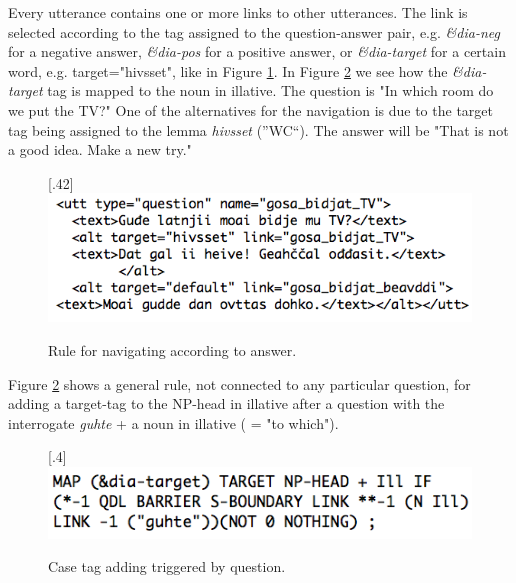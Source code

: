 \documentclass[11pt]{article}
\begin{document}
Every utterance contains one or more links to other utterances. The link is selected according to the tag assigned to the question-answer pair, e.g. \textit{\&dia-neg} for a negative answer, \textit{\&dia-pos} for a positive answer, or \textit{\&dia-target} for a certain word, e.g. target="hivsset", like in Figure \ref{TV}.  In Figure \ref{targetIll} we see how the \textit{\&dia-target} tag is mapped to the noun in illative. The question is "In which room do we put the TV?" One of the alternatives for the navigation is due to the target tag being assigned to the lemma \textit{hivsset} (''WC``). The answer will be "That is not a good idea. Make a new try."\\

\begin{figure}[htbp]
\begin{center}
\scalebox{.40}[.42]{\includegraphics{presentation/img/gosabidjatTV2.png}}
\caption{Rule for navigating according to answer.}
\label{TV}
\end{center}
\end{figure}

Figure \ref{targetIll} shows a general rule, not connected to any particular question, for adding a target-tag to the NP-head in illative after a question with the interrogate \textit{guhte} + a noun in illative ( = "to which").

\begin{figure}[htbp]
\begin{center}
\scalebox{.4}[.4]{\includegraphics{presentation/img/targetIll2.png}}
\caption{Case tag adding triggered by question.}
\label{targetIll}
\end{center}
\end{figure}
\end{document}
